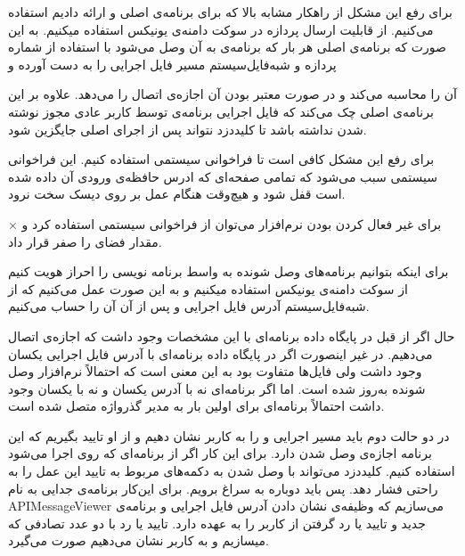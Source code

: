 برای رفع این مشکل از راهکار مشابه بالا که برای برنامه‌ی اصلی و  ارائه دادیم استفاده می‌کنیم. از قابلیت ارسال  پردازه در سوکت دامنه‌ی یونیکس استفاده میکنیم. به این صورت که برنامه‌ی اصلی هر بار که برنامه‌ی  به آن وصل می‌شود با استفاده از شماره پردازه و شبه‌فایل‌سیستم  مسیر فایل اجرایی  را به دست آورده و { آن را محاسبه می‌کند و در صورت معتبر بودن آن اجازه‌ی اتصال را می‌دهد. علاوه بر این برنامه‌ی اصلی چک می‌کند که فایل اجرایی برنامه‌ی  توسط کاربر عادی مجوز نوشته شدن نداشته باشد تا کلیددزد نتواند پس از اجرای  اصلی جایگزین شود.


برای رفع این مشکل کافی است تا فراخوانی سیستمی  استفاده کنیم. این فراخوانی سیستمی سبب می‌شود که تمامی صفحه‌ای که ادرس حافظه‌ی ورودی آن داده شده است قفل شود و هیچ‌وقت هنگام عمل  بر روی دیسک سخت نرود.

×
برای غیر فعال کردن  بودن نرم‌افزار می‌توان از فراخوانی سیستمی  استفاده کرد و مقدار فضای  را صفر قرار داد.



برای اینکه بتوانیم برنامه‌های وصل شونده به واسط برنامه نویسی را احراز هویت کنیم از سوکت دامنه‌ی یونیکس استفاده میکنیم و به این صورت عمل می‌کنیم که از شبه‌فایل‌سیستم  آدرس فایل اجرایی و پس از آن  آن را حساب می‌کنیم. 

حال اگر از قبل در پایگاه داده برنامه‌ای با این مشخصات وجود داشت که اجازه‌ی اتصال می‌دهیم. در غیر اینصورت اگر در پایگاه داده برنامه‌ای با آدرس فایل اجرایی یکسان وجود داشت ولی  فایل‌ها متفاوت بود به این معنی است که احتمالاً نرم‌افزار وصل شونده به‌روز شده است. اما اگر برنامه‌ای نه با آدرس یکسان و نه با  یکسان وجود داشت احتمالاً برنامه‌ای برای اولین بار به مدیر گذرواژه متصل شده است.

در دو حالت دوم باید مسیر اجرایی و  را به کاربر نشان دهیم و از او تایید بگیریم که این برنامه اجازه‌ی وصل شدن دارد. برای این کار اگر از برنامه‌ای که روی  اجرا می‌شود استفاده کنیم. کلیددزد می‌تواند با وصل شدن به  دکمه‌های مربوط به تایید این عمل را به راحتی فشار دهد. پس باید دوباره به سراغ  برویم. برای این‌کار برنامه‌ی جدایی به نام APIMessageViewer می‌سازیم که وظیفه‌ی نشان دادن آدرس فایل اجرایی و  برنامه‌ی جدید و تایید یا رد گرفتن از کاربر را به عهده دارد. تایید یا رد با دو عدد تصادفی که میسازیم و به کاربر نشان می‌دهیم صورت می‌گیرد. 

}
